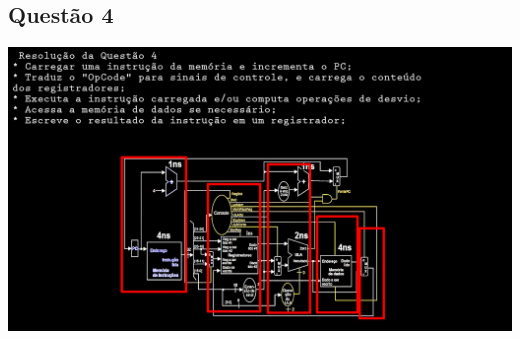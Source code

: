\documentclass{article}
\begin{document}
\subsection{Questão 4}
\centering
\includegraphics{Lista2/Parte4/Questao4.png}
\newpage
\end{document}
